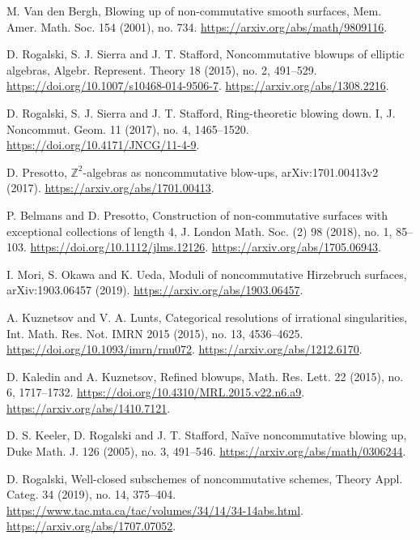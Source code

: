  M. Van den Bergh,
Blowing up of non-commutative smooth surfaces,
Mem. Amer. Math. Soc. 154 (2001), no. 734.
\url{https://arxiv.org/abs/math/9809116}.

 D. Rogalski, S. J. Sierra and J. T. Stafford,
Noncommutative blowups of elliptic algebras,
Algebr. Represent. Theory 18 (2015), no. 2, 491--529.
\url{https://doi.org/10.1007/s10468-014-9506-7}.
\url{https://arxiv.org/abs/1308.2216}.

 D. Rogalski, S. J. Sierra and J. T. Stafford,
Ring-theoretic blowing down. I,
J. Noncommut. Geom. 11 (2017), no. 4, 1465--1520.
\url{https://doi.org/10.4171/JNCG/11-4-9}.

 D. Presotto,
$\mathbb Z^2$-algebras as noncommutative blow-ups,
arXiv:1701.00413v2 (2017).
\url{https://arxiv.org/abs/1701.00413}.

 P. Belmans and D. Presotto,
Construction of non-commutative surfaces with exceptional collections of length 4,
J. London Math. Soc. (2) 98 (2018), no. 1, 85--103.
\url{https://doi.org/10.1112/jlms.12126}.
\url{https://arxiv.org/abs/1705.06943}.

 I. Mori, S. Okawa and K. Ueda,
Moduli of noncommutative Hirzebruch surfaces,
arXiv:1903.06457 (2019).
\url{https://arxiv.org/abs/1903.06457}.

 A. Kuznetsov and V. A. Lunts,
Categorical resolutions of irrational singularities,
Int. Math. Res. Not. IMRN 2015 (2015), no. 13, 4536--4625.
\url{https://doi.org/10.1093/imrn/rnu072}.
\url{https://arxiv.org/abs/1212.6170}.

 D. Kaledin and A. Kuznetsov,
Refined blowups,
Math. Res. Lett. 22 (2015), no. 6, 1717--1732.
\url{https://doi.org/10.4310/MRL.2015.v22.n6.a9}.
\url{https://arxiv.org/abs/1410.7121}.

 D. S. Keeler, D. Rogalski and J. T. Stafford,
Na\"ive noncommutative blowing up,
Duke Math. J. 126 (2005), no. 3, 491--546.
\url{https://arxiv.org/abs/math/0306244}.

 D. Rogalski,
Well-closed subschemes of noncommutative schemes,
Theory Appl. Categ. 34 (2019), no. 14, 375--404.
\url{https://www.tac.mta.ca/tac/volumes/34/14/34-14abs.html}.
\url{https://arxiv.org/abs/1707.07052}.

